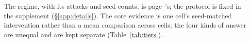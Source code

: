 \documentclass{article}
\begin{document}
\noindent The regime, with its attacks and seed counts, is page~\pageref{box:scope}'s; the protocol is fixed in the supplement (§\ref{app:details}). The core evidence is one cell's seed-matched intervention rather than a mean comparison across cells; the four kinds of answer are unequal and are kept separate (Table~\ref{tab:tiers}).
\end{document}
